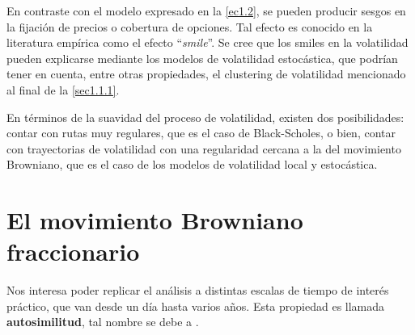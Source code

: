 \documentclass[letterpaper,12pt,oneside]{book}
\theoremstyle{plain}
\numberwithin{theorem}{section}
\begin{document}
En contraste con el modelo expresado en la \cref{ec1.2}, se pueden producir sesgos en la fijación de precios o cobertura de opciones. Tal efecto es conocido en la literatura empírica como el efecto ``\textsl{smile}''. Se cree que los smiles en la volatilidad pueden explicarse mediante los modelos de volatilidad estocástica, que podrían tener en cuenta, entre otras propiedades, el clustering de volatilidad mencionado al final de la \cref{sec1.1.1}.

En términos de la suavidad del proceso de volatilidad, existen dos posibilidades: contar con rutas muy regulares, que es el caso de Black-Scholes, o bien, contar con trayectorias de volatilidad con una regularidad cercana a la del movimiento Browniano, que es el caso de los modelos de volatilidad local y estocástica.
\section{El movimiento Browniano fraccionario}
Nos interesa poder replicar el análisis a distintas escalas de tiempo de interés práctico, que van desde un día hasta varios años. Esta propiedad es llamada \textbf{autosimilitud}, tal nombre se debe a \cite{mandelbrot_fractional_1968}.
\end{document}
